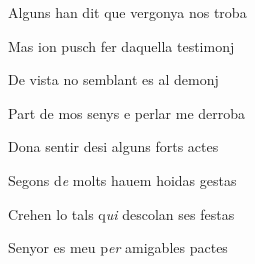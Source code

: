 \documentclass[12pt]{article}
\begin{document}
\begin{estrofa}

 Alguns han dit que vergonya nos troba

 Mas ion pusch fer daquella testimonj

 De vista no semblant es al demonj

 Part de mos senys e perlar me derroba

 Dona sentir desi alguns forts actes

 Segons d\textit{e} molts hauem hoidas gestas

 Crehen lo tals q\textit{ui} descolan ses festas

 Senyor es meu p\textit{er} amigables pactes

\end{estrofa}





\begin{estrofaBuida}


\end{estrofaBuida}



\begin{estrofaBuida}


\end{estrofaBuida}



\begin{estrofaBuida}


\end{estrofaBuida}
\end{document}
